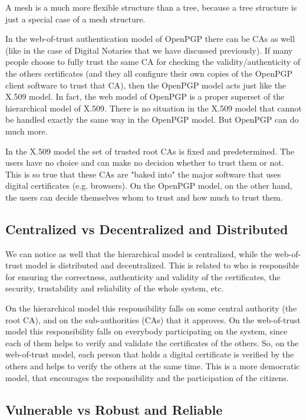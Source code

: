 \documentclass[a4paper]{article}
\begin{document}
A mesh is a much more flexible structure than a tree, because a tree
structure is just a special case of a mesh structure.

In the web-of-trust authentication model of OpenPGP there can be CAs
as well (like in the case of Digital Notaries that we have discussed
previously).  If many people choose to fully trust the same CA for
checking the validity/authenticity of the others certificates (and
they all configure their own copies of the OpenPGP client software to
trust that CA), then the OpenPGP model acts just like the X.509
model. In fact, the web model of OpenPGP is a proper superset of the
hierarchical model of X.509. There is no situation in the X.509 model
that cannot be handled exactly the same way in the OpenPGP model. But
OpenPGP can do much more.

In the X.509 model the set of trusted root CAs is fixed and
predetermined. The users have no choice and can make no decision
whether to trust them or not. This is so true that these CAs are
"baked into" the major software that uses digital certificates
(e.g. browsers). On the OpenPGP model, on the other hand, the users
can decide themselves whom to trust and how much to trust them.

\subsection{Centralized vs Decentralized and Distributed}

We can notice as well that the hierarchical model is centralized,
while the web-of-trust model is distributed and decentralized. This is
related to who is responsible for ensuring the correctness,
authenticity and validity of the certificates, the security,
trustability and reliability of the whole system, etc.

On the hierarchical model this responsibility falls on some central
authority (the root CA), and on the sub-authorities (CAs) that it
approves. On the web-of-trust model this responsibility falls on
everybody participating on the system, since each of them helps to
verify and validate the certificates of the others. So, on the
web-of-trust model, each person that holds a digital certificate is
verified by the others and helps to verify the others at the same
time. This is a more democratic model, that encourages the
responsibility and the participation of the citizens.

\subsection{Vulnerable vs Robust and Reliable}
\end{document}
